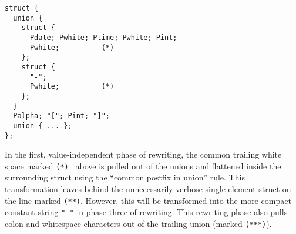 {\small
\begin{verbatim}
struct {
  union {
    struct {
      Pdate; Pwhite; Ptime; Pwhite; Pint;  
      Pwhite;          (*)
    };
    struct { 
      "-"; 
      Pwhite;          (*)
    };
  }
  Palpha; "["; Pint; "]";
  union { ... };
};
\end{verbatim}
}





In the first, value-independent phase of rewriting, 
the common trailing white space marked {\tt (*) } above is
pulled out of the unions and flattened inside the surrounding
struct using the ``common postfix in union'' rule.  This 
transformation leaves behind the unnecessarily verbose
single-element struct on the line marked {\tt (**)}.  However, this
will be transformed into the more compact constant 
string {\tt "-"} in phase three of rewriting.  This rewriting
phase also pulls colon and whitespace characters out of the 
trailing union (marked {\tt (***)}).

